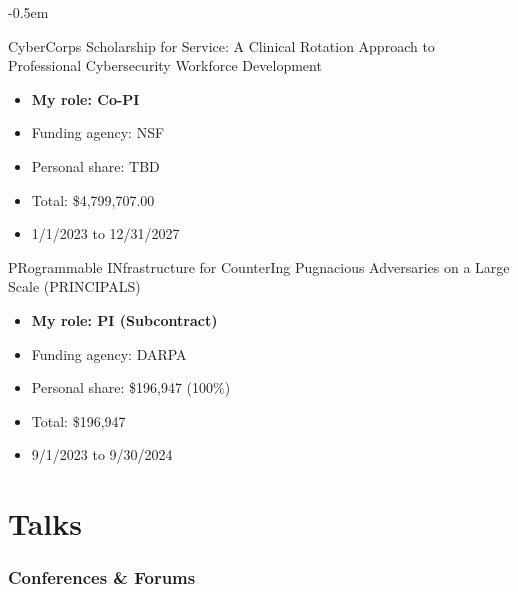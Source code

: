 \documentclass[10pt,singlecolumn]{article} %
\begin{document}
\begin{etaremune}
\itemsep -0.5em 

\item CyberCorps Scholarship for Service: A Clinical Rotation Approach to Professional Cybersecurity Workforce Development
    \begin{itemize}[noitemsep,topsep=0pt]
        \item \textbf{My role: Co-PI}
        \item Funding agency: NSF
        \item Personal share: TBD 
        \item Total: \$4,799,707.00
        \item 1/1/2023 to 12/31/2027
    \end{itemize}
\vspace{6pt}

\item PRogrammable INfrastructure for CounterIng Pugnacious Adversaries on a Large Scale (PRINCIPALS) 
    \begin{itemize}[noitemsep,topsep=0pt]
        \item \textbf{My role: PI (Subcontract)}
        \item Funding agency: DARPA
        \item Personal share: \$196,947 (100\%) 
        \item Total: \$196,947
        \item 9/1/2023 to 9/30/2024
    \end{itemize}
\vspace{6pt}

\end{etaremune}


\newpage 


\section{Talks} 

\subsubsection*{Conferences \& Forums}
\end{document}
